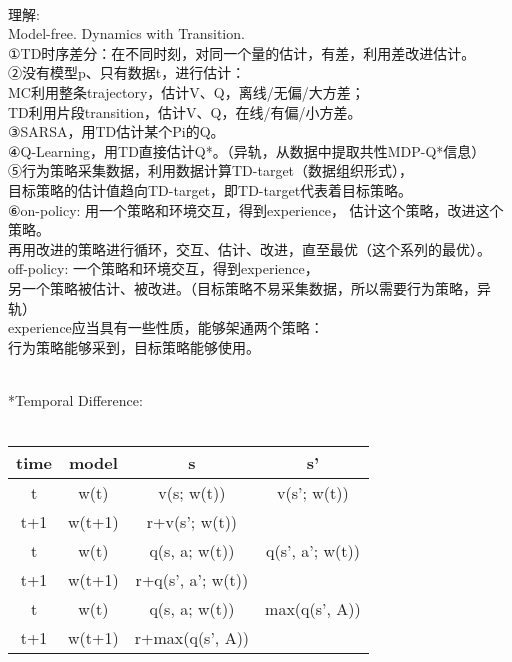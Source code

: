 \documentclass{article}
\begin{document}
~ \\[3pt]
\begin{CJK}{UTF8}{gbsn}
    理解: \\[5pt]
    Model-free. Dynamics with Transition. \\[5pt]
    ①TD时序差分：在不同时刻，对同一个量的估计，有差，利用差改进估计。 \\[5pt]
    ②没有模型p、只有数据t，进行估计： \\[5pt]
    MC利用整条trajectory，估计V、Q，离线/无偏/大方差； \\[5pt]
    TD利用片段transition，估计V、Q，在线/有偏/小方差。 \\[5pt]
    ③SARSA，用TD估计某个Pi的Q。 \\[5pt]
    ④Q-Learning，用TD直接估计Q*。（异轨，从数据中提取共性MDP-Q*信息） \\[5pt]
    ⑤行为策略采集数据，利用数据计算TD-target（数据组织形式）， \\[5pt]
    目标策略的估计值趋向TD-target，即TD-target代表着目标策略。 \\[5pt]
    ⑥on-policy: 用一个策略和环境交互，得到experience， 
    估计这个策略，改进这个策略。 \\[5pt]
    再用改进的策略进行循环，交互、估计、改进，直至最优（这个系列的最优）。 \\[5pt]
    off-policy: 一个策略和环境交互，得到experience， \\[5pt]
    另一个策略被估计、被改进。（目标策略不易采集数据，所以需要行为策略，异轨） \\[5pt]
    experience应当具有一些性质，能够架通两个策略： \\[5pt]
    行为策略能够采到，目标策略能够使用。 \\[5pt]
\end{CJK}


~ \\[18pt]
\centering
*Temporal Difference: \\[3pt]
~ \\[3pt]
\begin{tabular}{cccc}  %

    \toprule 
        time    & model     & s             & s'                \\[3pt]
    \midrule 
        t       & w(t)      & v(s; w(t))    & v(s'; w(t))       \\[3pt]
        t+1     & w(t+1)    & r+v(s'; w(t)) &                   \\[3pt]
        t       & w(t)      & q(s, a; w(t)) & q(s', a'; w(t))   \\[3pt]
        t+1     & w(t+1)    & r+q(s', a'; w(t)) &               \\[3pt]
        t       & w(t)      & q(s, a; w(t)) & max(q(s', A))     \\[3pt]
        t+1     & w(t+1)    & r+max(q(s', A))   &               \\[3pt]
    \bottomrule 

\end{tabular}
\flushleft
\end{document}
